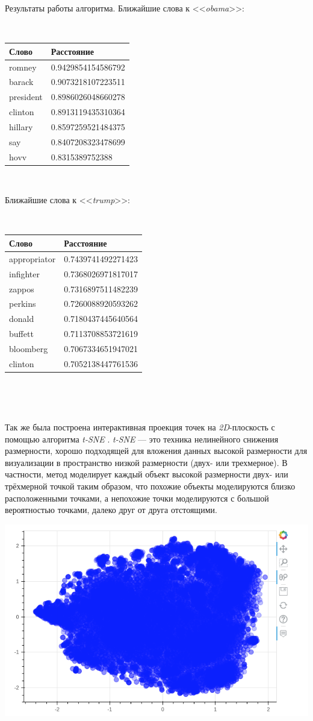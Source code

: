 Результаты работы алгоритма. Ближайшие слова к <<\textit{obama}>>:

$ $

\begin{tabular}{ | l | l | }
\hline
Слово & Расстояние \\ \hline
romney & 0.9429854154586792 \\ \hline
barack & 0.9073218107223511 \\ \hline
president & 0.8986026048660278 \\ \hline
clinton & 0.8913119435310364 \\ \hline
hillary & 0.8597259521484375 \\ \hline
say & 0.8407208323478699 \\ \hline
hovv & 0.8315389752388 \\ \hline
\end{tabular}

$ $

Ближайшие слова к <<\textit{trump}>>:

$ $

\begin{tabular}{ | l | l | }
\hline
Слово & Расстояние \\ \hline
appropriator & 0.7439741492271423 \\ \hline
infighter & 0.7368026971817017 \\ \hline
zappos & 0.7316897511482239 \\ \hline
perkins & 0.7260088920593262 \\ \hline
donald & 0.7180437445640564 \\ \hline
buffett &  0.7113708853721619 \\ \hline
bloomberg & 0.7067334651947021 \\ \hline
clinton &  0.7052138447761536 \\ \hline
\end{tabular}

$ $

$  $

Так же была построена интерактивная проекция точек на \textit{2D}-плоскость с помощью алгоритма \textit{t-SNE} \cite{bib7}. \textit{t-SNE} --- это техника нелинейного снижения размерности, хорошо подходящей для вложения данных высокой размерности для визуализации в пространство низкой размерности (двух- или трехмерное). В частности, метод моделирует каждый объект высокой размерности двух- или трёхмерной точкой таким образом, что похожие объекты моделируются близко расположенными точками, а непохожие точки моделируются с большой вероятностью точками, далеко друг от друга отстоящими.

\includegraphics[scale=0.75]{pics/points.png}